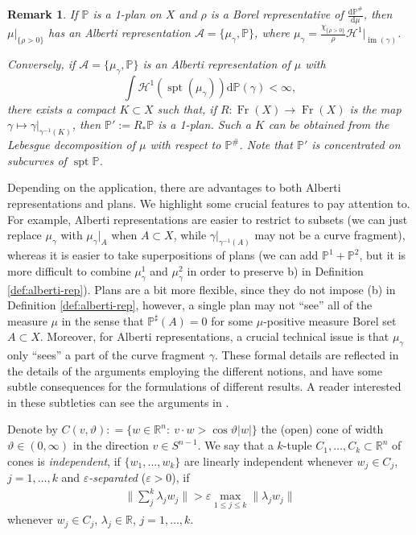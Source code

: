 \documentclass{amsart}
\newtheorem{remark}[theorem]{Remark}
\numberwithin{equation}{section}
\newcommand{\R}{\mathbb{R}}
\renewcommand{\P}{\mathbb{P}}
\newcommand{\Ha}{\mathcal{H}}
\newcommand{\spt}{\operatorname{spt}}
\newcommand{\im}{\operatorname{im}}
\newcommand{\Fr}{\operatorname{Fr}}
\newcommand{\ud}{\mathrm {d}}
\newcommand{\inv}{^{-1}}
\newcommand{\defl}{\mathrel{\mathop:}=}
\begin{document}
\begin{remark}\label{rmk:alb-rep-vs-1-plans}
If $\P$ is a 1-plan on $X$ and $\rho$ is a Borel representative of $\frac{\ud \P^\#}{\ud\mu}$, then $\mu|_{\{\rho>0\}}$ has an Alberti representation $\mathcal A=\{\mu_\gamma,\P\}$, where $\mu_\gamma=\frac{\chi_{\{\rho>0\}}}{\rho} \Ha^1|_{\im(\gamma)}$.

Conversely, if $\mathcal A=\{\mu_\gamma,\P\} $ is an Alberti representation of $\mu$ with 
\[
\int\Ha^1(\spt(\mu_\gamma))\ud\P(\gamma)<\infty,
\]
there exists a compact $K\subset X$ such that, if $R:\Fr(X)\to \Fr(X)$ is the map $\gamma\mapsto \gamma|_{\gamma\inv(K)}$,
then $\P':=R_\ast\P$ is a 1-plan.
Such a $K$ can be obtained from the Lebesgue decomposition of $\mu$ with respect to $\P^\#$.
Note that $\P'$ is concentrated on subcurves of $\spt\P$.
\end{remark}

Depending on the application, there are advantages to both Alberti representations and plans. We highlight some crucial features to pay attention to. For example, Alberti representations are easier to restrict to subsets (we can just replace $\mu_\gamma$ with $\mu_\gamma|_A$ when $A\subset X$, while $\gamma|_{\gamma\inv(A)}$ may not be a curve fragment), whereas it is easier to take superpositions of plans (we can add $\P^1+\P^2$, but it is more difficult to combine $\mu_\gamma^1$ and $\mu_\gamma^2$ in order to preserve b) in Definition \ref{def:alberti-rep}).  Plans are a bit more flexible, since they do not impose (b) in Definition \ref{def:alberti-rep}, however, a single plan may not ``see'' all of the measure $\mu$ in the sense that $\mathbb{P}^\sharp(A)=0$ for some $\mu$-positive measure Borel set $A\subset X$. Moreover, for Alberti representations, a crucial technical issue is that $\mu_\gamma$ only ``sees'' a part of the curve fragment $\gamma$. These formal details are reflected in the details of the arguments employing the different notions, and have some subtle consequences for the formulations of different results.  A reader interested in these subtleties can see the arguments in \cite{sch16b,bate15}.

Denote by $C(v,\vartheta)\defl\{w\in \R^n:\ v\cdot w>\cos\vartheta |w| \}$ the (open) cone of width $\vartheta\in (0,\infty)$ in the direction $v\in S^{n-1}$. We say that a $k$-tuple $C_1,\ldots, C_k\subset \R^n$ of cones is \emph{independent}, if $\{w_1,\ldots, w_k\}$ are linearly independent whenever $w_j\in C_j$, $j=1,\ldots,k$ and \emph{$\varepsilon$-separated} ($\varepsilon>0$), if
\begin{align*}
	\bigg\|\sum_j^k\lambda_jw_j\bigg\|>\varepsilon \max_{1\le j\le k}\|\lambda_jw_j\|
\end{align*}
whenever $w_j\in C_j$, $\lambda_j\in\R$, $j=1,\ldots, k$. 
\end{document}
